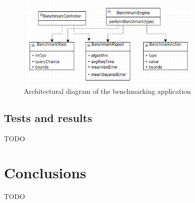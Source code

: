 \documentclass[12pt]{article}
\begin{document}
	\begin{figure}
		\label{architecture}
		\caption{Architectural diagram of the benchmarking application}
		\centering
		  \includegraphics[width=0.8\textwidth]{diagram.png}
	  \end{figure}

	\subsection{Tests and results}
	TODO 

	\section{Conclusions}
	TODO

	\newpage
	
	
\end{document}
